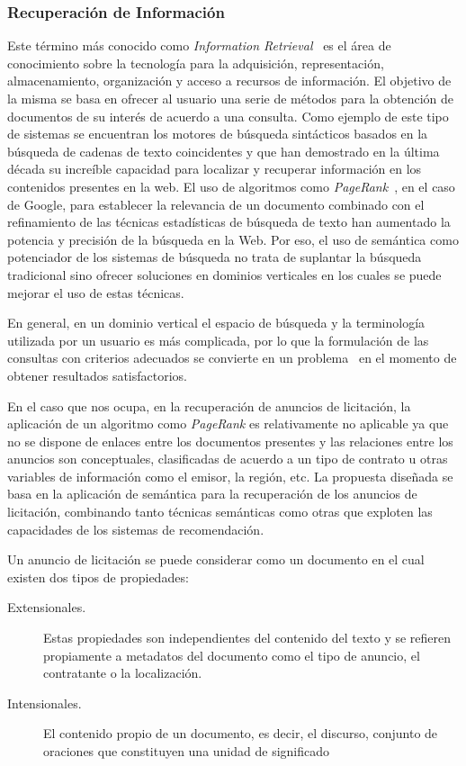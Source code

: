 \subsubsection{Recuperación de Información}
Este término más conocido como \textit{Information Retrieval}~\cite{Manning:2008:IIR:1394399} es el área 
de conocimiento sobre la tecnología para la adquisición, representación, almacenamiento, 
organización y acceso a recursos de información. El objetivo de la misma 
se basa en ofrecer al usuario una serie de métodos para la obtención 
de documentos de su interés de acuerdo a una consulta. Como ejemplo 
de este tipo de sistemas se encuentran los motores de búsqueda sintácticos 
basados en la búsqueda de cadenas de texto coincidentes y que han demostrado 
en la última década su increíble capacidad para localizar y recuperar 
información en los contenidos presentes en la web. El uso de algoritmos 
como \textit{PageRank}~\cite{Page:1998:PCR}, en el caso de Google, para establecer la relevancia 
de un documento combinado con el refinamiento de las técnicas estadísticas 
de búsqueda de texto han aumentado la potencia y precisión de la búsqueda 
en la Web. Por eso, el uso de semántica como potenciador de los sistemas 
de búsqueda no trata de suplantar la búsqueda tradicional sino ofrecer soluciones 
en dominios verticales en los cuales se puede mejorar el uso de estas técnicas.

En general, en un dominio vertical el espacio de búsqueda y la terminología 
utilizada por un usuario es más complicada, por lo que la formulación de las 
consultas con criterios adecuados se convierte en un problema~\cite{Maslov2009} en el momento 
de obtener resultados satisfactorios.

En el caso que nos ocupa, en la recuperación de anuncios de licitación, la aplicación 
de un algoritmo como \textit{PageRank} es relativamente no aplicable ya que 
no se dispone de enlaces entre los documentos presentes y las relaciones 
entre los anuncios son conceptuales, clasificadas de acuerdo a un tipo de 
contrato u otras variables de información como el emisor, la región, etc. La 
propuesta diseñada se basa en la aplicación de semántica para la recuperación 
de los anuncios de licitación, combinando tanto técnicas semánticas como otras 
que exploten las capacidades de los sistemas de recomendación. 

Un anuncio de licitación se puede considerar como un documento en el cual existen dos 
tipos de propiedades:
\begin{description}
 \item [Extensionales.] Estas propiedades son independientes del contenido 
del texto y se refieren propiamente a metadatos del documento como el tipo 
de anuncio, el contratante o la localización.
\item [Intensionales.] El contenido propio de un documento, es decir, el  
discurso, conjunto de oraciones que constituyen una unidad de significado
\end{description}

